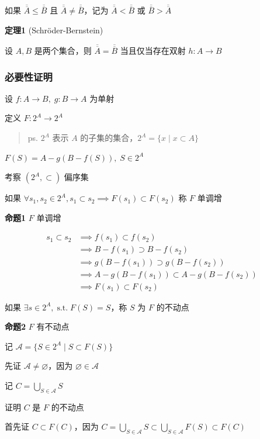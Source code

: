 如果 \(\overline{\overline{A}}\leq \overline{\overline{B}}\) 且
\(\overline{\overline{A}}\neq \overline{\overline{B}}\)，记为
\(\overline{\overline{A}}< \overline{\overline{B}}\) 或
\(\overline{\overline{B}}>\overline{\overline{A}}\)

\textbf{定理1} (Schröder-Bernstein)

设 \(A,B\) 是两个集合，则
\(\overline{\overline{A}}=\overline{\overline{B}}\) 当且仅当存在双射
\(h:A\to B\)

\subsubsection{必要性证明}\label{ux5fc5ux8981ux6027ux8bc1ux660e}

设 \(f:A\to B,\;g:B\to A\) 为单射

定义 \(F:2^A\to 2^A\)

\begin{quote}
ps. \(2^A\) 表示 \(A\) 的子集的集合，\(2^A=\{x\mid x \subset A\}\)
\end{quote}

\(F(S)=A-g(B-f(S)), \; S\in 2^A\)

考察 \((2^A,\subset)\) 偏序集

如果
\(\forall s_{1},s_{2}\in {2}^{A},s_{1}\subset s_{2}\implies F(s_{1})\subset F(s_{2})\)
称 \(F\) 单调增

\textbf{命题1} \(F\) 单调增

\[
\begin{aligned}
s_{1}\subset s_{2} &\implies f(s_{1})\subset f(s_{2}) \\
&\implies B-f(s_{1}) \supset B-f(s_{2}) \\
&\implies g(B-f(s_{1}))\supset g(B-f(s_{2})) \\
&\implies A-g(B-f(s_{1})) \subset A-g(B-f(s_{2}))\\
&\implies F(s_{1})\subset F(s_{2})
\end{aligned}
\]

如果 \(\exists s \in 2^A, \;\text{s.t.} \; F(S)=S\)，称 \(S\) 为 \(F\)
的不动点

\textbf{命题2} \(F\) 有不动点

记 \(\mathscr{A}=\{ S\in 2^A\mid S\subset F(S) \}\)

先证 \(\mathscr{A} \neq \varnothing\)，因为
\(\varnothing \in \mathscr{A}\)

记 \(C=\bigcup_{S\in \mathscr{A}} S\)

证明 \(C\) 是 \(F\) 的不动点

首先证 \(C\subset F(C)\)，因为
\(C=\bigcup_{S\in\mathscr{A}}S \subset \bigcup_{S\in\mathscr{A}}F(S) \subset F(C)\)

